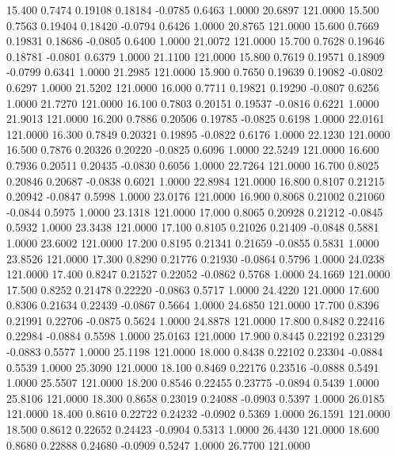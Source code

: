   15.400   0.7474   0.19108   0.18184  -0.0785   0.6463   1.0000  20.6897 121.0000
  15.500   0.7563   0.19404   0.18420  -0.0794   0.6426   1.0000  20.8765 121.0000
  15.600   0.7669   0.19831   0.18686  -0.0805   0.6400   1.0000  21.0072 121.0000
  15.700   0.7628   0.19646   0.18781  -0.0801   0.6379   1.0000  21.1100 121.0000
  15.800   0.7619   0.19571   0.18909  -0.0799   0.6341   1.0000  21.2985 121.0000
  15.900   0.7650   0.19639   0.19082  -0.0802   0.6297   1.0000  21.5202 121.0000
  16.000   0.7711   0.19821   0.19290  -0.0807   0.6256   1.0000  21.7270 121.0000
  16.100   0.7803   0.20151   0.19537  -0.0816   0.6221   1.0000  21.9013 121.0000
  16.200   0.7886   0.20506   0.19785  -0.0825   0.6198   1.0000  22.0161 121.0000
  16.300   0.7849   0.20321   0.19895  -0.0822   0.6176   1.0000  22.1230 121.0000
  16.500   0.7876   0.20326   0.20220  -0.0825   0.6096   1.0000  22.5249 121.0000
  16.600   0.7936   0.20511   0.20435  -0.0830   0.6056   1.0000  22.7264 121.0000
  16.700   0.8025   0.20846   0.20687  -0.0838   0.6021   1.0000  22.8984 121.0000
  16.800   0.8107   0.21215   0.20942  -0.0847   0.5998   1.0000  23.0176 121.0000
  16.900   0.8068   0.21002   0.21060  -0.0844   0.5975   1.0000  23.1318 121.0000
  17.000   0.8065   0.20928   0.21212  -0.0845   0.5932   1.0000  23.3438 121.0000
  17.100   0.8105   0.21026   0.21409  -0.0848   0.5881   1.0000  23.6002 121.0000
  17.200   0.8195   0.21341   0.21659  -0.0855   0.5831   1.0000  23.8526 121.0000
  17.300   0.8290   0.21776   0.21930  -0.0864   0.5796   1.0000  24.0238 121.0000
  17.400   0.8247   0.21527   0.22052  -0.0862   0.5768   1.0000  24.1669 121.0000
  17.500   0.8252   0.21478   0.22220  -0.0863   0.5717   1.0000  24.4220 121.0000
  17.600   0.8306   0.21634   0.22439  -0.0867   0.5664   1.0000  24.6850 121.0000
  17.700   0.8396   0.21991   0.22706  -0.0875   0.5624   1.0000  24.8878 121.0000
  17.800   0.8482   0.22416   0.22984  -0.0884   0.5598   1.0000  25.0163 121.0000
  17.900   0.8445   0.22192   0.23129  -0.0883   0.5577   1.0000  25.1198 121.0000
  18.000   0.8438   0.22102   0.23304  -0.0884   0.5539   1.0000  25.3090 121.0000
  18.100   0.8469   0.22176   0.23516  -0.0888   0.5491   1.0000  25.5507 121.0000
  18.200   0.8546   0.22455   0.23775  -0.0894   0.5439   1.0000  25.8106 121.0000
  18.300   0.8658   0.23019   0.24088  -0.0903   0.5397   1.0000  26.0185 121.0000
  18.400   0.8610   0.22722   0.24232  -0.0902   0.5369   1.0000  26.1591 121.0000
  18.500   0.8612   0.22652   0.24423  -0.0904   0.5313   1.0000  26.4430 121.0000
  18.600   0.8680   0.22888   0.24680  -0.0909   0.5247   1.0000  26.7700 121.0000

